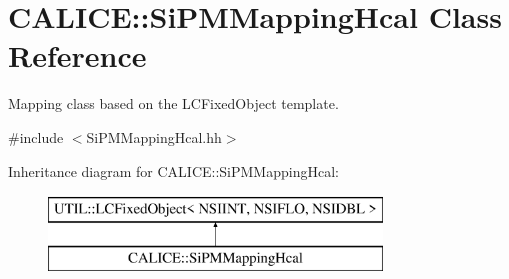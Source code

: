 \section{C\-A\-L\-I\-C\-E\-:\-:Si\-P\-M\-Mapping\-Hcal Class Reference}
\label{classCALICE_1_1SiPMMappingHcal}


Mapping class based on the L\-C\-Fixed\-Object template.  




{\ttfamily \#include $<$Si\-P\-M\-Mapping\-Hcal.\-hh$>$}

Inheritance diagram for C\-A\-L\-I\-C\-E\-:\-:Si\-P\-M\-Mapping\-Hcal\-:\begin{figure}[H]
\begin{center}
\leavevmode
\includegraphics[height=2.000000cm]{classCALICE_1_1SiPMMappingHcal}
\end{center}
\end{figure}

